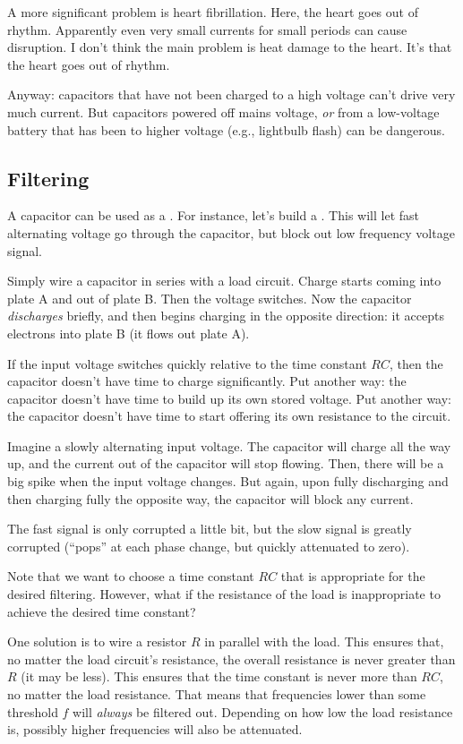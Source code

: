 \documentclass[11pt, oneside]{amsart}
\begin{document}
A more significant problem is heart fibrillation. Here, the heart goes
out of rhythm. Apparently even very small currents for small periods can
cause disruption. I don't think the main problem is heat damage to the
heart. It's that the heart goes out of rhythm.

Anyway: capacitors that have not been charged to a high voltage can't
drive very much current. But capacitors powered off mains voltage,
\emph{or} from a low-voltage battery that has been 
to higher voltage (e.g., lightbulb flash) can be dangerous.

\subsection{Filtering}

A capacitor can be used as a . For instance, let's build
a . This will let fast alternating voltage go
through the capacitor, but block out low frequency voltage signal.

Simply wire a capacitor in series with a load circuit. Charge starts
coming into plate A and out of plate B. Then the voltage switches. Now
the capacitor \emph{discharges} briefly, and then begins charging in the
opposite direction: it accepts electrons into plate B (it flows out plate
A).

If the input voltage switches quickly relative to the time constant
$RC$, then the capacitor doesn't have time to charge significantly. Put
another way: the capacitor doesn't have time to build up its own stored
voltage. Put another way: the capacitor doesn't have time to start
offering its own resistance to the circuit.

Imagine a slowly alternating input voltage. The capacitor will charge
all the way up, and the current out of the capacitor will stop flowing.
Then, there will be a big spike when the input voltage changes. But
again, upon fully discharging and then charging fully the opposite way,
the capacitor will block any current.

The fast signal is only corrupted a little bit, but the slow signal is
greatly corrupted (``pops'' at each phase change, but quickly attenuated
to zero).

Note that we want to choose a time constant $RC$ that is appropriate for
the desired filtering. However, what if the resistance of the load is
inappropriate to achieve the desired time constant?

One solution is to wire a resistor $R$ in parallel with the load. This
ensures that, no matter the load circuit's resistance, the overall
resistance is never greater than $R$ (it may be less). This ensures that
the time constant is never more than $RC$, no matter the load
resistance. That means that frequencies lower than some threshold $f$
will \emph{always} be filtered out. Depending on how low the load
resistance is, possibly higher frequencies will also be attenuated.
\end{document}
